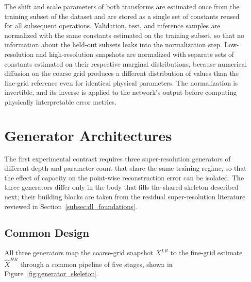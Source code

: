 The shift and scale parameters of both transforms are estimated once from the training subset of the dataset and are stored as a single set of constants reused for all subsequent operations. Validation, test, and inference samples are normalized with the same constants estimated on the training subset, so that no information about the held-out subsets leaks into the normalization step. Low-resolution and high-resolution snapshots are normalized with separate sets of constants estimated on their respective marginal distributions, because numerical diffusion on the coarse grid produces a different distribution of values than the fine-grid reference even for identical physical parameters. The normalization is invertible, and its inverse is applied to the network's output before computing physically interpretable error metrics.



\section{Generator Architectures}
\label{sec:method_generators}

The first experimental contrast requires three super-resolution generators of different depth and parameter count that share the same training regime, so that the effect of capacity on the point-wise reconstruction error can be isolated. The three generators differ only in the body that fills the shared skeleton described next; their building blocks are taken from the residual super-resolution literature reviewed in Section~\ref{subsec:dl_foundations}.


\subsection*{Common Design}
\label{subsec:method_generators_common}

All three generators map the coarse-grid snapshot $X^{LR}$ to the fine-grid estimate $\widehat{X}^{HR}$ through a common pipeline of five stages, shown in Figure~\ref{fig:generator_skeleton}.

